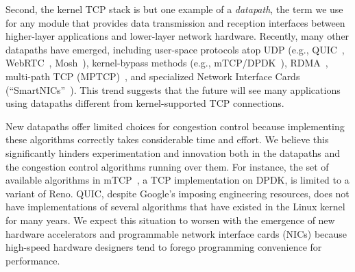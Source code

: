 Second, the kernel TCP stack is but one example of a {\em datapath}, the term we use for any module that provides data transmission and reception interfaces between higher-layer applications and lower-layer network hardware. Recently, many other datapaths have emerged, including user-space protocols atop UDP (e.g., QUIC~\cite{quic}, WebRTC~\cite{webrtc}, Mosh~\cite{mosh}), kernel-bypass methods (e.g., mTCP/DPDK~\cite{dpdk,mtcp,netmap}), RDMA~\cite{dcqcn}, multi-path TCP (MPTCP)~\cite{mptcp}, and specialized Network Interface Cards (``SmartNICs''~\cite{smartnic}). This trend suggests that the future will see many applications using datapaths different from kernel-supported TCP connections.
%

New datapaths offer limited choices for congestion control because implementing these algorithms correctly takes considerable time and effort. 
%
We believe this significantly hinders experimentation and innovation both in the datapaths and the congestion control algorithms running over them.
%
For instance, the set of available algorithms in mTCP~\cite{mtcp}, a TCP implementation on DPDK, is limited to a variant of Reno. 
%
%
QUIC, despite Google's imposing engineering resources, does not have implementations of several algorithms that have existed in the Linux kernel for many years.  
We expect this situation to worsen with the emergence of new hardware accelerators and programmable network interface cards (NICs) because high-speed hardware designers tend to forego programming convenience for performance. 

